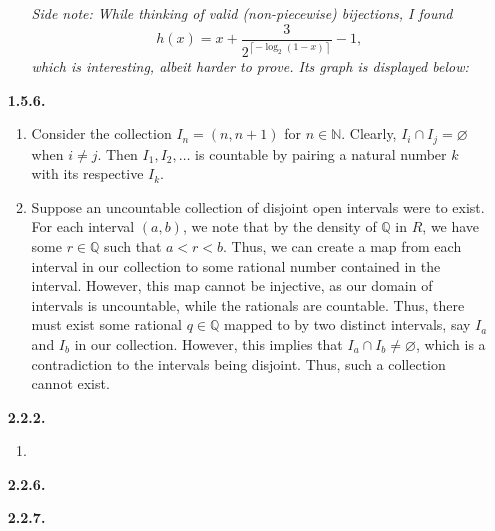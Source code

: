 \documentclass[11pt,letterpaper]{article}
\newcommand{\N}{\mathbb{N}}
\begin{document}
\begin{enumerate}
\begin{enumerate}
   \textit{Side note: While thinking of valid (non-piecewise) bijections, I found}
    \[
        h(x) = x+\frac{3}{2^{\left\lceil -\log_{2}\left(1-x\right)\right\rceil}} - 1,
    \]
    \textit{which is interesting, albeit harder to prove. Its graph is displayed below:}
    
\end{enumerate}
\item[\textbf{1.5.6.}]
\begin{enumerate}
    \item Consider the collection $I_n = (n,n+1)$ for $n \in \N$. Clearly, $I_i\cap I_j = \varnothing$ when $i \neq j$. Then $I_1, I_2, \dots$ is countable by pairing a natural number $k$ with its respective $I_k$.
    \item Suppose an uncountable collection of disjoint open intervals were to exist. For each interval $(a,b)$, we note that by the density of $\mathbb{Q}$ in $R$, we have some $r\in \mathbb{Q}$ such that $a<r<b$. Thus, we can create a map from each interval in our collection to some rational number contained in the interval. However, this map cannot be injective, as our domain of intervals is uncountable, while the rationals are countable. Thus, there must exist some rational $q\in \mathbb{Q}$ mapped to by two distinct intervals, say $I_a$ and $I_b$ in our collection. However, this implies that $I_a \cap I_b \neq \varnothing$, which is a contradiction to the intervals being disjoint. Thus, such a collection cannot exist.
\end{enumerate}
\item[\textbf{2.2.2.}]
    \begin{enumerate}
        \item 
    \end{enumerate}
\item[\textbf{2.2.6.}]
\item[\textbf{2.2.7.}]


\end{enumerate}
\end{document}
